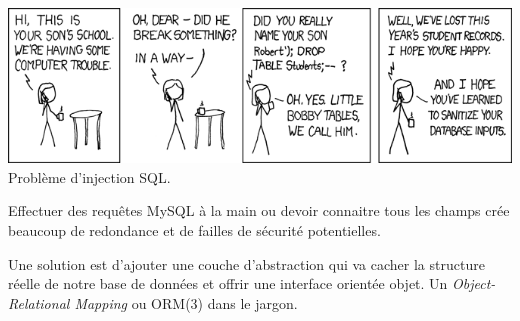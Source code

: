 \includegraphics{src/img/exploits_of_a_mom.png} Problème d'injection
SQL.

Effectuer des requêtes MySQL à la main ou devoir connaitre tous les
champs crée beaucoup de redondance et de failles de sécurité
potentielles.

Une solution est d'ajouter une couche d'abstraction qui va cacher la
structure réelle de notre base de données et offrir une interface
orientée objet. Un \emph{Object-Relational Mapping} ou ORM(3) dans le
jargon.

\begin{english}

\begin{Shaded}
\begin{Highlighting}[]

\NormalTok{ = }\OtherTok{(}
\OtherTok{);}
\OtherTok{(}\OtherTok{(}\OtherTok{));}
\NormalTok{ = }\OtherTok{(}\NormalTok{::}\OtherTok{);}


\NormalTok{ = }\OtherTok{(}\OtherTok{,} \OtherTok{);}
\NormalTok{ = }\OtherTok{(}\OtherTok{,} \OtherTok{);}
\end{Highlighting}
\end{Shaded}

\end{english}

